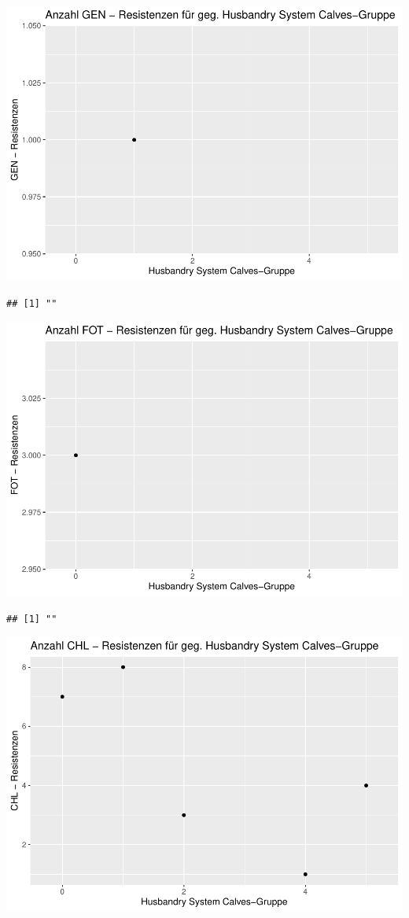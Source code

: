 \documentclass[
]{article}
\begin{document}
\includegraphics{NResistenzen_files/figure-latex/unnamed-chunk-7-34.pdf}

\begin{verbatim}
## [1] ""
\end{verbatim}

\includegraphics{NResistenzen_files/figure-latex/unnamed-chunk-7-35.pdf}

\begin{verbatim}
## [1] ""
\end{verbatim}

\includegraphics{NResistenzen_files/figure-latex/unnamed-chunk-7-36.pdf}
\end{document}
